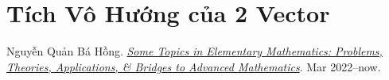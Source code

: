 \documentclass[oneside]{book}
\numberwithin{equation}{section}
\begin{document}
\section{Tích Vô Hướng của 2 Vector}


\begin{thebibliography}{99}
	 Nguyễn Quản Bá Hồng. \href{https://github.com/NQBH/hobby/blob/master/elementary_mathematics/some_topics_in_elementary_mathematics_problems_theories_applications_bridges_to_advanced_mathematics/NQBH_some_topics_in_elementary_mathematics_problems_theories_applications_bridges_to_advanced_mathematics.pdf}{\textit{Some Topics in Elementary Mathematics: Problems, Theories, Applications, \& Bridges to Advanced Mathematics}}. Mar 2022--now.
\end{thebibliography}


\printbibliography[heading=bibintoc]
\end{document}
